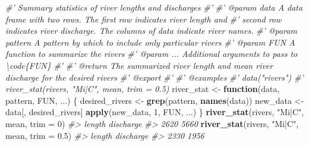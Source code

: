 \documentclass[
]{book}
\newenvironment{Shaded}{\begin{snugshade}}{\end{snugshade}}
\newcommand{\CommentTok}[1]{\textcolor[rgb]{0.56,0.35,0.01}{\textit{#1}}}
\newcommand{\ControlFlowTok}[1]{\textcolor[rgb]{0.13,0.29,0.53}{\textbf{#1}}}
\newcommand{\DataTypeTok}[1]{\textcolor[rgb]{0.13,0.29,0.53}{#1}}
\newcommand{\DecValTok}[1]{\textcolor[rgb]{0.00,0.00,0.81}{#1}}
\newcommand{\FloatTok}[1]{\textcolor[rgb]{0.00,0.00,0.81}{#1}}
\newcommand{\KeywordTok}[1]{\textcolor[rgb]{0.13,0.29,0.53}{\textbf{#1}}}
\newcommand{\NormalTok}[1]{#1}
\newcommand{\StringTok}[1]{\textcolor[rgb]{0.31,0.60,0.02}{#1}}
\begin{document}
\begin{Shaded}
\begin{Highlighting}[]
\CommentTok{#' Summary statistics of river lengths and discharges}
\CommentTok{#'}
\CommentTok{#' @param data A data frame with two rows. The first row indicates river length and}
\CommentTok{#'   second row indicates river discharge. The columns of data indicate river names.}
\CommentTok{#' @param pattern A pattern by which to include only particular rivers}
\CommentTok{#' @param FUN A function to summarize the rivers}
\CommentTok{#' @param ... Additional arguments to pass to \textbackslash{}code\{FUN\}}
\CommentTok{#'}
\CommentTok{#' @return The summarized river length and mean river discharge for the desired rivers}
\CommentTok{#' @export}
\CommentTok{#'}
\CommentTok{#' @examples}
\CommentTok{#' data("rivers")}
\CommentTok{#' river_stat(rivers, "Mi|C", mean, trim = 0.5)}
\NormalTok{river_stat <-}\StringTok{ }\ControlFlowTok{function}\NormalTok{(data, pattern, FUN, ...) \{}
\NormalTok{  desired_rivers <-}\StringTok{ }\KeywordTok{grep}\NormalTok{(pattern, }\KeywordTok{names}\NormalTok{(data))}
\NormalTok{  new_data <-}\StringTok{ }\NormalTok{data[, desired_rivers]}
  \KeywordTok{apply}\NormalTok{(new_data, }\DecValTok{1}\NormalTok{, FUN, ...)}
\NormalTok{\}}
\KeywordTok{river_stat}\NormalTok{(rivers, }\StringTok{"Mi|C"}\NormalTok{, mean, }\DataTypeTok{trim =} \DecValTok{0}\NormalTok{)}
\CommentTok{#>    length discharge }
\CommentTok{#>      2620      5660}
\KeywordTok{river_stat}\NormalTok{(rivers, }\StringTok{"Mi|C"}\NormalTok{, mean, }\DataTypeTok{trim =} \FloatTok{0.5}\NormalTok{)}
\CommentTok{#>    length discharge }
\CommentTok{#>      2330      1956}
\end{Highlighting}
\end{Shaded}

  
\end{document}
